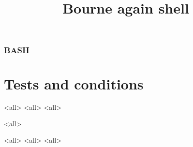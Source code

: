 
\title[bash]{Bourne again shell}




\begin{frame}
	\frametitle{BASH}
	\titlepage
	\vspace{-0.5cm}
	\begin{center}
	\end{center}
\end{frame}

\begin{frame}
	\tableofcontents
\end{frame}





\section{Tests and conditions}
\mode<all>{}
\mode<all>{}
\mode<all>{}

\mode<all>{}



\mode<all>{}
\mode<all>{}
\mode<all>{}



